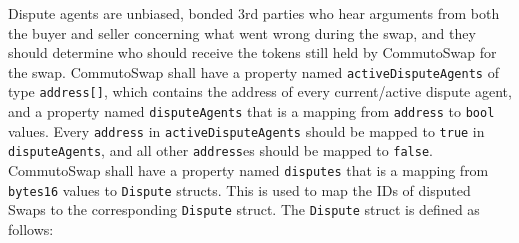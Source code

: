 \documentclass[11pt]{article}
\begin{document}
    Dispute agents are unbiased, bonded 3rd parties who hear arguments from both the buyer and
    seller concerning what went wrong during the swap, and they should determine who should receive
    the tokens still held by CommutoSwap for the swap.
    CommutoSwap shall have a property named \verb|activeDisputeAgents| of type \verb|address[]|,
    which contains the address of every current/active dispute agent, and a property named
    \verb|disputeAgents| that is a mapping from \verb|address| to \verb|bool| values.
    Every \verb|address| in \verb|activeDisputeAgents| should be mapped to \verb|true| in
    \verb|disputeAgents|, and all other \verb|address|es should be mapped to \verb|false|.
    CommutoSwap shall have a property named \verb|disputes| that is a mapping from \verb|bytes16|
    values to \verb|Dispute| structs.
    This is used to map the IDs of disputed Swaps to the corresponding \verb|Dispute| struct.
    The \verb|Dispute| struct is defined as follows:
\end{document}
